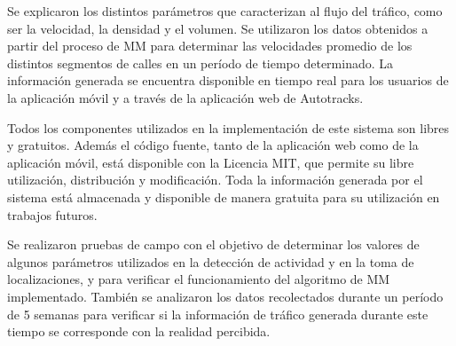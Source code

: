 Se explicaron los distintos parámetros que caracterizan al flujo del tráfico, como ser la velocidad, la densidad y el volumen. Se utilizaron los datos obtenidos a partir del proceso de MM para determinar las velocidades promedio de los distintos segmentos de calles en un período de tiempo determinado. La información generada se encuentra disponible en tiempo real para los usuarios de la aplicación móvil y a través de la aplicación web de Autotracks.

Todos los componentes utilizados en la implementación de este sistema son libres y gratuitos. Además el código fuente, tanto de la aplicación web como de la aplicación móvil, está disponible con la Licencia MIT, que permite su libre utilización, distribución y modificación. Toda la información generada por el sistema está almacenada y disponible de manera gratuita para su utilización en trabajos futuros.

Se realizaron pruebas de campo con el objetivo de determinar los valores de algunos parámetros utilizados en la detección de actividad y en la toma de localizaciones, y para verificar el funcionamiento del algoritmo de MM implementado. También se analizaron los datos recolectados durante un período de 5 semanas para verificar si la información de tráfico generada durante este tiempo se corresponde con la realidad percibida.

